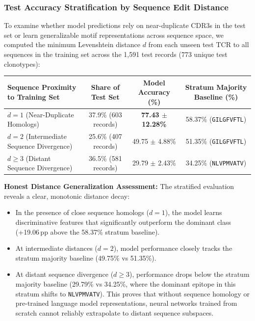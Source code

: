 \documentclass[11pt,a4paper]{article}
\begin{document}
\subsubsection{Test Accuracy Stratification by Sequence Edit Distance}
To examine whether model predictions rely on near-duplicate CDR3s in the test set or learn generalizable motif representations across sequence space, we computed the minimum Levenshtein distance $d$ from each unseen test TCR to all sequences in the training set across the 1{,}591 test records (773 unique test clonotypes):

\begin{center}
\begin{longtable}{@{}p{5.2cm}ccc@{}}
\toprule
\textbf{Sequence Proximity to Training Set} & \textbf{Share of Test Set} & \textbf{Model Accuracy (\%)} & \textbf{Stratum Majority Baseline (\%)} \\
\midrule
\endhead
$d = 1$ (Near-Duplicate Homologs)          & 37.9\% (603 records) & \textbf{77.43 $\pm$ 12.28\%} & 58.37\% (\lstinline|GILGFVFTL|) \\
$d = 2$ (Intermediate Sequence Divergence)  & 25.6\% (407 records) & 49.75 $\pm$ 4.88\%           & 51.35\% (\lstinline|GILGFVFTL|) \\
$d \ge 3$ (Distant Sequence Divergence)     & 36.5\% (581 records) & 29.79 $\pm$ 2.43\%           & 34.25\% (\lstinline|NLVPMVATV|) \\
\bottomrule
\end{longtable}
\end{center}

\noindent\textbf{Honest Distance Generalization Assessment:} The stratified evaluation reveals a clear, monotonic distance decay:
\begin{itemize}[itemsep=2pt]
  \item In the presence of close sequence homologs ($d=1$), the model learns discriminative features that significantly outperform the dominant class (+19.06\,pp above the 58.37\% stratum baseline).
  \item At intermediate distances ($d=2$), model performance closely tracks the stratum majority baseline (49.75\% vs 51.35\%).
  \item At distant sequence divergence ($d \ge 3$), performance drops below the stratum majority baseline (29.79\% vs 34.25\%, where the dominant epitope in this stratum shifts to \lstinline|NLVPMVATV|). This proves that without sequence homology or pre-trained language model representations, neural networks trained from scratch cannot reliably extrapolate to distant sequence subspaces.
\end{itemize}
\end{document}
